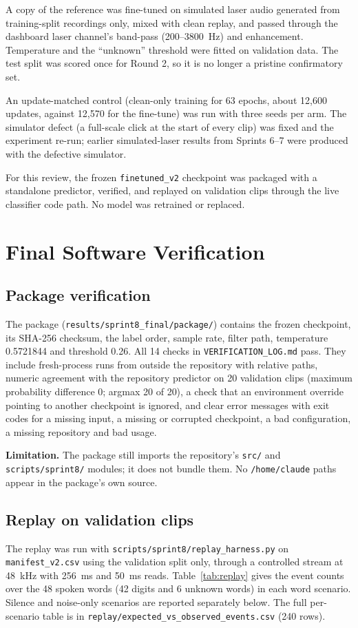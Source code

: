 \documentclass{article}
\begin{document}
A copy of the reference was fine-tuned on simulated laser audio generated from training-split recordings only, mixed with clean replay, and passed through the dashboard laser channel's band-pass (200--3800~Hz) and enhancement. Temperature and the ``unknown'' threshold were fitted on validation data. The test split was scored once for Round 2, so it is no longer a pristine confirmatory set.

An update-matched control (clean-only training for 63 epochs, about 12,600 updates, against 12,570 for the fine-tune) was run with three seeds per arm. The simulator defect (a full-scale click at the start of every clip) was fixed and the experiment re-run; earlier simulated-laser results from Sprints 6--7 were produced with the defective simulator.

For this review, the frozen \texttt{finetuned\_v2} checkpoint was packaged with a standalone predictor, verified, and replayed on validation clips through the live classifier code path. No model was retrained or replaced.

\section{Final Software Verification}
\subsection{Package verification}
The package (\texttt{results/sprint8\_final/package/}) contains the frozen checkpoint, its SHA-256 checksum, the label order, sample rate, filter path, temperature 0.5721844 and threshold 0.26. All 14 checks in \texttt{VERIFICATION\_LOG.md} pass. They include fresh-process runs from outside the repository with relative paths, numeric agreement with the repository predictor on 20 validation clips (maximum probability difference 0; argmax 20 of 20), a check that an environment override pointing to another checkpoint is ignored, and clear error messages with exit codes for a missing input, a missing or corrupted checkpoint, a bad configuration, a missing repository and bad usage.

\textbf{Limitation.} The package still imports the repository's \texttt{src/} and \texttt{scripts/sprint8/} modules; it does not bundle them. No \texttt{/home/claude} paths appear in the package's own source.

\subsection{Replay on validation clips}\label{sec:replay}
The replay was run with \texttt{scripts/sprint8/replay\_harness.py} on \texttt{manifest\_v2.csv} using the validation split only, through a controlled stream at 48~kHz with 256~ms and 50~ms reads. Table~\ref{tab:replay} gives the event counts over the 48 spoken words (42 digits and 6 unknown words) in each word scenario. Silence and noise-only scenarios are reported separately below. The full per-scenario table is in \texttt{replay/expected\_vs\_observed\_events.csv} (240 rows).
\end{document}
